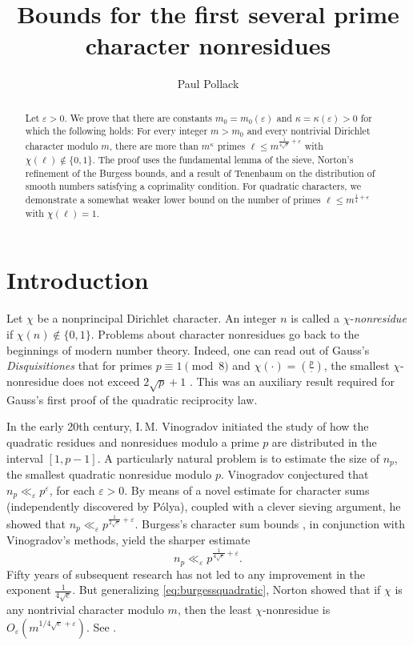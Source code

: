 \documentclass{scrartcl}
\title{{Bounds for the first several prime character nonresidues}}
\author{{Paul Pollack}}
\date{\vspace{-3.2ex}}
\theoremstyle{plain}
\theoremstyle{remark}
\newcommand{\1}{\mathbf{1}}
\newcommand\leg{\genfrac(){.4pt}{}}
\begin{document}
\maketitle

\begin{abstract}\noindent Let $\varepsilon > 0$. We prove that there are constants $m_0=m_0(\varepsilon)$ and $\kappa=\kappa(\varepsilon) > 0$ for which the following holds: For every integer $m > m_0$ and every nontrivial Dirichlet character modulo $m$, there are more than $m^{\kappa}$ primes $\ell \le m^{\frac{1}{4\sqrt{e}}+\varepsilon}$ with $\chi(\ell)\notin \{0,1\}$. The proof uses the fundamental lemma of the sieve, Norton's refinement of the Burgess bounds, and a result of Tenenbaum on the  distribution of smooth numbers satisfying a coprimality condition. For quadratic characters, we demonstrate a somewhat weaker lower bound on the number of primes $\ell \le m^{\frac14+\epsilon}$ with $\chi(\ell)=1$.
\end{abstract}

\section{Introduction}
Let $\chi$ be a nonprincipal Dirichlet character.  An integer $n$ is called a $\chi$-\emph{nonresidue} if $\chi(n) \notin \{0,1\}$. Problems about character nonresidues go back to the beginnings of modern number theory. Indeed, one can read out of Gauss's \emph{Disquisitiones} that for primes $p\equiv 1\pmod{8}$ and $\chi(\cdot) = \leg{p}{\cdot}$, the smallest $\chi$-nonresidue does not exceed $2\sqrt{p}+1$ \cite[Article 129]{gauss86}. This was an auxiliary result required for Gauss's first proof of the quadratic reciprocity law.

In the early 20th century, I.\,M. Vinogradov initiated the study of how the quadratic residues and nonresidues modulo a prime $p$ are distributed in the interval $[1,p-1]$. A particularly natural problem is to estimate the size of $n_p$, the smallest quadratic nonresidue modulo $p$. Vinogradov conjectured that $n_p \ll_{\varepsilon} p^{\varepsilon}$, for each $\varepsilon >0$. By means of a novel estimate for character sums (independently discovered by P\'olya), coupled with a clever sieving argument, he showed \cite{vinogradov18} that $n_p \ll_{\varepsilon} p^{\frac{1}{2\sqrt{e}} + \varepsilon}$. Burgess's character sum bounds \cite{burgess57}, in conjunction with Vinogradov's methods, yield the sharper estimate
\begin{equation}\label{eq:burgessquadratic} n_p \ll_{\varepsilon} p^{\frac{1}{4\sqrt{e}}+\varepsilon}. \end{equation}
Fifty years of subsequent research has not led to any improvement in the exponent $\frac{1}{4\sqrt{e}}$. But generalizing \eqref{eq:burgessquadratic}, Norton showed that if $\chi$ is any nontrivial character modulo $m$, then the least $\chi$-nonresidue is $O_{\varepsilon}(m^{1/4\sqrt{e} + \varepsilon})$. See \cite[Theorem 1.30]{norton98}.
\end{document}
